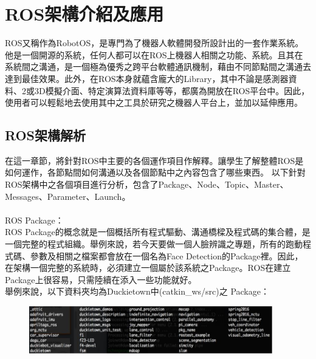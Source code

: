 \documentclass{article}
\begin{document}
\newpage
\section{ROS架構介紹及應用}
ROS又稱作為RobotOS，是專門為了機器人軟體開發所設計出的一套作業系統。他是一個開源的系統，任何人都可以在ROS上機器人相關之功能、系統。且其在系統間之溝通，是一個極為優秀之跨平台軟體通訊機制，藉由不同節點間之溝通去達到最佳效果。此外，在ROS本身就蘊含龐大的Library，其中不論是感測器資料、2或3D模擬介面、特定演算法資料庫等等，都廣為開放在ROS平台中。因此，使用者可以輕鬆地去使用其中之工具於研究之機器人平台上，並加以延伸應用。

\subsection{ROS架構解析}
在這一章節，將針對ROS中主要的各個運作項目作解釋。讓學生了解整體ROS是如何運作，各節點間如何溝通以及各個節點中之內容包含了哪些東西。
以下針對ROS架構中之各個項目進行分析，包含了Package、Node、Topic、Master、Messages、Parameter、Launch。
\\
\\ROS Package：
\\ROS Package的概念就是一個概括所有程式驅動、溝通橋樑及程式碼的集合體，是一個完整的程式組織。舉例來說，若今天要做一個人臉辨識之專題，所有的跑動程式碼、參數及相關之檔案都會放在一個名為Face Detection的Package裡。因此，在架構一個完整的系統時，必須建立一個屬於該系統之Package。ROS在建立Package上很容易，只需陸續在添入一些功能就好。
\\舉例來說，以下資料夾均為Duckietown中(catkin\_ws/src)之 Package：
\\
\begin{figure}[htp]
    \begin{center}
        \includegraphics[width=300pt]{pic/圖片17.jpg}
    \end{center}
\end{figure}
\end{document}
